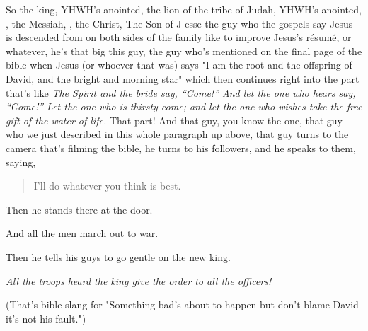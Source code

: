 {
}
{
}
{
	So the king,
	YHWH's%
	anointed, the lion%
	of the tribe of Judah,
	YHWH's anointed,%
	,
	the Messiah,%
	,
	the Christ,%
	The Son of J esse
	the guy who the gospels say Jesus is descended from on both sides of the
	family like to improve Jesus's résumé, or whatever, he's that big this guy,
	the guy who's mentioned on the final page of the bible when Jesus (or
	whoever that was) says "I am the root and the offspring of David, and the
	bright and morning star" which then continues right into the part that's
	like \emph{The Spirit and the bride say, “Come!” And let the one who hears
	say, “Come!” Let the one who is thirsty come; and let the one who wishes
	take the free gift of the water of life.} That part! And that guy, you know
	the one, that guy who we just described in this whole paragraph up above,
	that guy turns to the camera that's filming the bible, he turns to his
	followers, and he speaks to them, saying,

	\begin{quote}
	I'll do whatever you think is best.
	\end{quote}

	Then he stands there at the door.

	And all the men march out to war.
}

{
}
{
}
{
	Then he tells his guys to go gentle on the new king.

	\emph{All the troops heard the king give the order to all the
	officers!}

	(That's bible slang for "Something bad's about to happen but don't blame
	David it's not his fault.")
}

